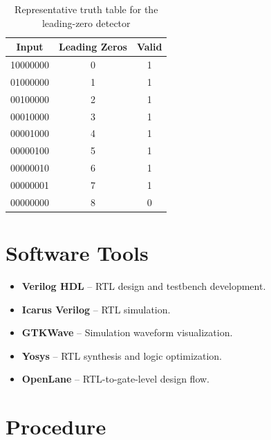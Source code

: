 \documentclass[12pt,a4paper]{report}
\begin{document}
\begin{table}[H]
    \centering
    \begin{tabular}{|c|c|c|}
        \hline
        \textbf{Input} & \textbf{Leading Zeros} & \textbf{Valid} \\
        \hline
        10000000 & 0 & 1 \\
        \hline
        01000000 & 1 & 1 \\
        \hline
        00100000 & 2 & 1 \\
        \hline
        00010000 & 3 & 1 \\
        \hline
        00001000 & 4 & 1 \\
        \hline
        00000100 & 5 & 1 \\
        \hline
        00000010 & 6 & 1 \\
        \hline
        00000001 & 7 & 1 \\
        \hline
        00000000 & 8 & 0 \\
        \hline
    \end{tabular}
    \caption{Representative truth table for the leading-zero detector}
    \label{tab:lzd}
\end{table}

\section{Software Tools}

\begin{itemize}
    \item \textbf{Verilog HDL} -- RTL design and testbench development.
    \item \textbf{Icarus Verilog} -- RTL simulation.
    \item \textbf{GTKWave} -- Simulation waveform visualization.
    \item \textbf{Yosys} -- RTL synthesis and logic optimization.
    \item \textbf{OpenLane} -- RTL-to-gate-level design flow.
\end{itemize}

\section{Procedure}
\end{document}
